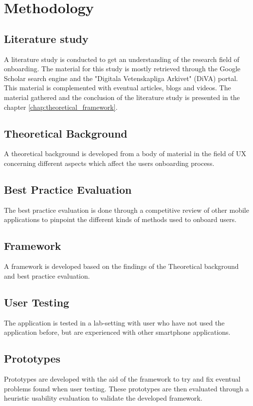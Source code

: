 \chapter{Methodology}
\label{chap:methodology}

\section{Literature study}
A literature study is conducted to get an understanding of the research field of onboarding. The material for this study is mostly retrieved through the Google Scholar search engine and the "Digitala Vetenskapliga Arkivet" (DiVA) portal. This material is complemented with eventual articles, blogs and videos. The material gathered and the conclusion of the literature study is presented in the chapter \ref{chap:theoretical_framework}.

\section{Theoretical Background}
A theoretical background is developed from a body of material in the field of UX concerning different aspects which affect the users onboarding process.

\section{Best Practice Evaluation}
%
The best practice evaluation is done through a competitive review \cite{Schade2013} of other mobile applications to pinpoint the different kinds of methods used to onboard users.

\section{Framework}
A framework is developed based on the findings of the Theoretical background and best practice evaluation.

\section{User Testing}
%
The application is tested in a lab-setting with user who have not used the application before, but are experienced with other smartphone applications. 

\section{Prototypes}
%
Prototypes are developed with the aid of the framework to try and fix eventual problems found when user testing. These prototypes are then evaluated through a heuristic usability evaluation to validate the developed framework.
